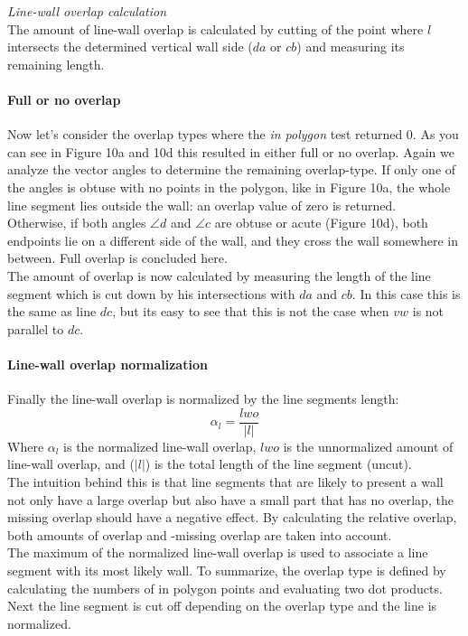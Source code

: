 	\emph{Line-wall overlap calculation}\\
	The amount of line-wall overlap is calculated by cutting of the
	point where $l$ intersects the determined vertical wall side ($da$ or
	$cb$) and measuring its remaining length.\\

	\paragraph{Full or no overlap}
	Now let's consider the overlap types where the \emph{in polygon} test
	returned 0.
	As you can see in Figure 10a and 10d this resulted in either full or no overlap.
	Again we analyze the vector angles to determine the remaining overlap-type.
	If only one of the angles is obtuse with no points in the polygon, like in Figure 10a,
	the whole line segment lies outside the wall: an overlap value of zero
	is returned.\\
	Otherwise, if both angles $\angle d$ and $\angle c$ are obtuse or acute (Figure 10d),
	both endpoints lie on a different side of the wall, and they cross the wall somewhere in
	between. Full overlap is concluded here. \\
	The amount of overlap is now calculated by measuring the length
	of the line segment which is cut down by his intersections with $da$ and
	$cb$. In this case this is the same as line $dc$, but its easy to see that
	this is not the case when $vw$ is not parallel to $dc$.\\
	
	\paragraph{Line-wall overlap normalization}
	Finally the line-wall overlap is normalized by the line segments length:\\
	\begin{equation}
		\alpha_l = \frac{lwo}{|l|}
	\end{equation}
	Where $\alpha_l$ is the normalized line-wall overlap, $lwo$ is the unnormalized
	amount of line-wall overlap, and ($|l|$) is the total length of the line
	segment (uncut).\\
	The intuition behind this is that line segments that are likely to
	present a wall not only have a large overlap but also have a small part
	that has no overlap, the missing overlap should have a negative effect. By
	calculating the relative overlap, both amounts of overlap and -missing
	overlap are taken into account.\\
	The maximum of the normalized line-wall overlap is used to associate a
	line segment with its most likely wall.
	To summarize, the overlap type is defined by calculating the numbers of in
	polygon points and evaluating two dot products. Next the line segment is cut off
	depending on the overlap type and the line is normalized. \\
	
